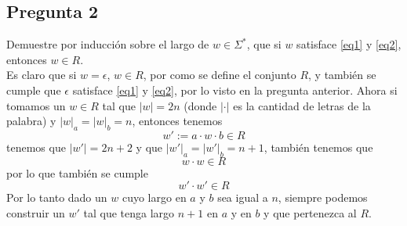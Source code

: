 \documentclass[letter]{article}
\begin{document}
	\begin{pregunta}{2}
		\section*{Pregunta 2}
		Demuestre por inducción sobre el largo de $w\in \Sigma^{*}$, que si $w$ satisface \eqref{eq1} y \eqref{eq2}, entonces $w\in R$.\\
		
		Es claro que si $w=\epsilon$, $w\in R$, por como se define el conjunto $R$, y también se cumple que $\epsilon$ satisface \eqref{eq1} y \eqref{eq2}, por lo visto en la pregunta anterior. Ahora si tomamos un $w\in R$ tal que $|w| = 2n$ (donde $|\cdot|$ es la cantidad de letras de la palabra) y $|w|_a = |w|_b=n$, entonces tenemos
		$$w':=a\cdot w\cdot b \in R $$
		tenemos que $|w'|=2n+2$ y que $|w'|_a=|w'|_b = n+1$, también tenemos que
		$$w\cdot w \in R$$
		por lo que también se cumple
		$$w'\cdot w' \in R$$
		Por lo tanto dado un $w$ cuyo largo en $a$ y $b$ sea igual a $n$, siempre podemos construir un $w'$ tal que tenga largo $n+1$ en $a$ y en $b$ y que pertenezca al $R$.	
	\end{pregunta}
\end{document}

